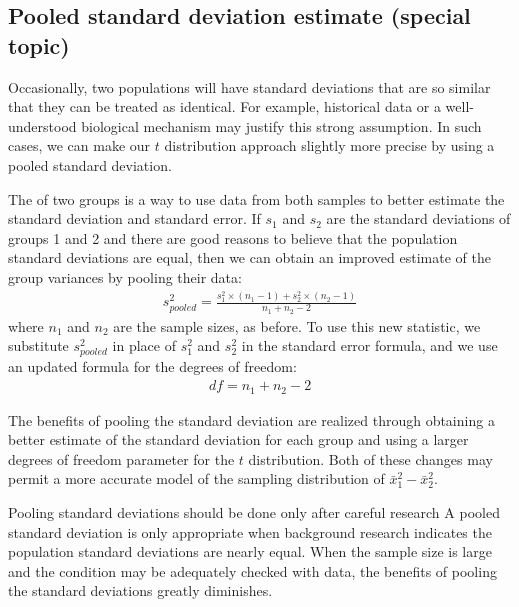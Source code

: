 \subsection{Pooled standard deviation estimate (special topic)}
\label{pooledStandardDeviations}

Occasionally, two populations will have standard deviations that are so similar that they can be treated as identical. For example, historical data or a well-understood biological mechanism may justify this strong assumption. In such cases, we can make our $t$ distribution approach slightly more precise by using a pooled standard deviation.

The  of two groups is a way to use data from both samples to better estimate the standard deviation and standard error. If $s_1^{}$ and $s_2^{}$ are the standard deviations of groups 1 and 2 and there are good reasons to believe that the population standard deviations are equal, then we can obtain an improved estimate of the group variances by pooling their data:
\begin{align*}
s_{pooled}^2 = \frac{s_1^2\times (n_1-1) + s_2^2\times (n_2-1)}{n_1 + n_2 - 2}
\end{align*}
where $n_1$ and $n_2$ are the sample sizes, as before. To use this new statistic, we substitute $s_{pooled}^2$ in place of $s_1^2$ and $s_2^2$ in the standard error formula, and we use an updated formula for the degrees of freedom:
\begin{align*}
df = n_1 + n_2 - 2
\end{align*}

The benefits of pooling the standard deviation are realized through obtaining a better estimate of the standard deviation for each group and using a larger degrees of freedom parameter for the $t$ distribution. Both of these changes may permit a more accurate model of the sampling distribution of $\bar{x}_1^2 - \bar{x}_2^2$.

\begin{caution}
{Pooling standard deviations should be done only after careful research}
{A pooled standard deviation is only appropriate when background research indicates the population standard deviations are nearly equal. When the sample size is large and the condition may be adequately checked with data, the benefits of pooling the standard deviations greatly diminishes.}
\end{caution}


\textB{\newpage}


